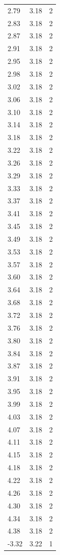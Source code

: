 \begin{longtable}{lrr}
  2.79 & 3.18 & 2 \\
  2.83 & 3.18 & 2 \\
  2.87 & 3.18 & 2 \\
  2.91 & 3.18 & 2 \\
  2.95 & 3.18 & 2 \\
  2.98 & 3.18 & 2 \\
  3.02 & 3.18 & 2 \\
  3.06 & 3.18 & 2 \\
  3.10 & 3.18 & 2 \\
  3.14 & 3.18 & 2 \\
  3.18 & 3.18 & 2 \\
  3.22 & 3.18 & 2 \\
  3.26 & 3.18 & 2 \\
  3.29 & 3.18 & 2 \\
  3.33 & 3.18 & 2 \\
  3.37 & 3.18 & 2 \\
  3.41 & 3.18 & 2 \\
  3.45 & 3.18 & 2 \\
  3.49 & 3.18 & 2 \\
  3.53 & 3.18 & 2 \\
  3.57 & 3.18 & 2 \\
  3.60 & 3.18 & 2 \\
  3.64 & 3.18 & 2 \\
  3.68 & 3.18 & 2 \\
  3.72 & 3.18 & 2 \\
  3.76 & 3.18 & 2 \\
  3.80 & 3.18 & 2 \\
  3.84 & 3.18 & 2 \\
  3.87 & 3.18 & 2 \\
  3.91 & 3.18 & 2 \\
  3.95 & 3.18 & 2 \\
  3.99 & 3.18 & 2 \\
  4.03 & 3.18 & 2 \\
  4.07 & 3.18 & 2 \\
  4.11 & 3.18 & 2 \\
  4.15 & 3.18 & 2 \\
  4.18 & 3.18 & 2 \\
  4.22 & 3.18 & 2 \\
  4.26 & 3.18 & 2 \\
  4.30 & 3.18 & 2 \\
  4.34 & 3.18 & 2 \\
  4.38 & 3.18 & 2 \\
  -3.32 & 3.22 & 1 \\

\end{longtable}
